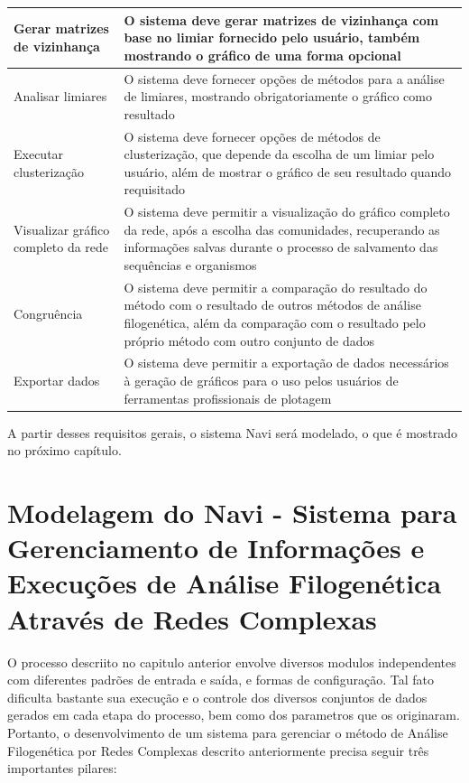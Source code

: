 \begin{table}
\begin{tabular}{p{5cm}p{10cm}}
Gerar matrizes de vizinhança & O sistema deve gerar matrizes de vizinhança com base no limiar fornecido pelo usuário, também mostrando o gráfico de uma
forma opcional \\ \hline
Analisar limiares & O sistema deve fornecer opções de métodos para a análise de limiares, mostrando obrigatoriamente o gráfico como resultado\\ \hline
Executar clusterização & O sistema deve fornecer opções de métodos de clusterização, que depende da escolha de um limiar pelo usuário, além de mostrar o
gráfico de seu resultado quando requisitado \\ \hline
Visualizar gráfico completo da rede & O sistema deve permitir a visualização do gráfico completo da rede, após a escolha das comunidades, recuperando as
informações salvas durante o processo de salvamento das sequências e organismos \\ \hline
Congruência & O sistema deve permitir a comparação do resultado do método com o resultado de outros métodos de análise filogenética, além da comparação
com o resultado pelo próprio método com outro conjunto de dados \\ \hline
Exportar dados & O sistema deve permitir a exportação de dados necessários à geração de gráficos para o uso pelos usuários de ferramentas profissionais de
plotagem \\ \hline
\end{tabular}
\label{tab:requisitos}
\end{table} 

A partir desses requisitos gerais, o sistema Navi será modelado, o que é mostrado no próximo capítulo.


\chapter{Modelagem do Navi - Sistema para Gerenciamento de Informações e Execuções de Análise Filogenética Através de Redes Complexas}
\label{cap:navi}

O processo descriito no capitulo anterior envolve diversos modulos independentes com diferentes padrões de entrada e saída, e formas de configuração. Tal
fato dificulta bastante sua execução e o controle dos diversos conjuntos de dados gerados em cada etapa do processo, bem como dos parametros que os originaram.
Portanto, o desenvolvimento de um sistema para gerenciar o método de Análise Filogenética por Redes Complexas descrito anteriormente precisa seguir três
importantes pilares:

